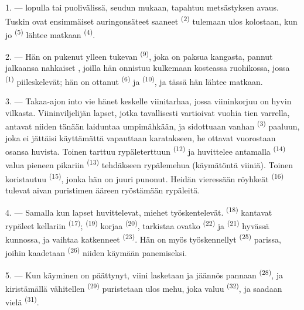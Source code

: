 \VUsaut{1.4mm}
\VUsaut{4.0mm}

1. ---  lopulla tai  puolivälissä, seudun mukaan,
tapahtuu metsästyksen avaus. Tuskin ovat ensimmäiset auringonsäteet saaneet
 \textsuperscript{(2)} tulemaan ulos kolostaan, kun jo
 \textsuperscript{(5)} lähtee matkaan 
\textsuperscript{(4)}.

2. --- Hän on pukenut ylleen tukevan 
\textsuperscript{(9)}, joka on paksua kangasta, pannut jalkaansa nahkaiset
, joilla hän onnistuu kulkemaan kosteassa ruohikossa, jossa
 \textsuperscript{(1)} piileskelevät; hän on ottanut
 \textsuperscript{(6)} ja 
\textsuperscript{(10)}, ja tässä hän lähtee matkaan.

3. --- Takaa-ajon into vie hänet keskelle viinitarhaa, jossa viininkorjuu on
hyvin vilkasta. Viininviljelijän lapset, jotka tavallisesti vartioivat vuohia
tien varrella, antavat niiden tänään laiduntaa umpimähkään, ja sidottuaan vanhan
 \textsuperscript{(3)} paaluun, joka ei jättäisi käyttämättä
vapauttaan karatakseen, he ottavat vuorostaan osansa huvista. Toinen tarttuu
rypäleterttuun  \textsuperscript{(12)} ja huvittelee
antamalla  \textsuperscript{(14)} valua pieneen pikariin
\textsuperscript{(13)} tehdäkseen rypälemehua (käymätöntä viiniä). Toinen
koristautuu  \textsuperscript{(15)}, jonka hän on juuri
punonut. Heidän vieressään röyhkeät  \textsuperscript{(16)}
tulevat aivan puristimen ääreen ryöstämään rypäleitä.

4. --- Samalla kun lapset huvittelevat, miehet työskentelevät.
 \textsuperscript{(18)} kantavat rypäleet kellariin
 \textsuperscript{(17)}; 
\textsuperscript{(19)} korjaa  \textsuperscript{(20)},
tarkistaa ovatko  \textsuperscript{(22)} ja 
\textsuperscript{(21)} hyvässä kunnossa, ja vaihtaa katkenneet 
\textsuperscript{(23)}. Hän on myös työskennellyt 
\textsuperscript{(25)} parissa, joihin kaadetaan 
\textsuperscript{(26)} niiden käymään panemiseksi.

5. --- Kun käyminen on päättynyt, viini lasketaan ja jäännös pannaan
 \textsuperscript{(28)}, ja kiristämällä vähitellen
 \textsuperscript{(29)} puristetaan ulos mehu, joka valuu
 \textsuperscript{(32)}, ja saadaan vielä
 \textsuperscript{(31)}.

